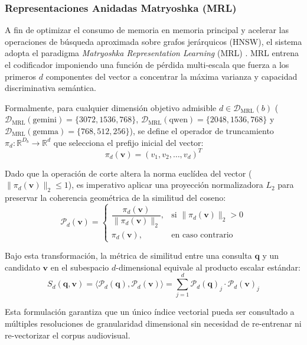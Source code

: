 \subsubsection{Representaciones Anidadas Matryoshka (MRL)}
A fin de optimizar el consumo de memoria en memoria principal y acelerar las operaciones de búsqueda aproximada sobre grafos jerárquicos (HNSW), el sistema adopta el paradigma \textit{Matryoshka Representation Learning} (MRL) \cite{kusupati2022matryoshka}. MRL entrena el codificador imponiendo una función de pérdida multi-escala que fuerza a los primeros $d$ componentes del vector a concentrar la máxima varianza y capacidad discriminativa semántica.

Formalmente, para cualquier dimensión objetivo admisible $d \in \mathcal{D}_{\text{MRL}}(b)$ ($\mathcal{D}_{\text{MRL}}(\text{gemini}) = \{3072, 1536, 768\}$, $\mathcal{D}_{\text{MRL}}(\text{qwen}) = \{2048, 1536, 768\}$ y $\mathcal{D}_{\text{MRL}}(\text{gemma}) = \{768, 512, 256\}$), se define el operador de truncamiento $\pi_d: \mathbb{R}^{D_b} \to \mathbb{R}^d$ que selecciona el prefijo inicial del vector:
\begin{equation}
    \pi_d(\mathbf{v}) = (v_1, v_2, \dots, v_d)^T
\end{equation}

Dado que la operación de corte altera la norma euclídea del vector ($\|\pi_d(\mathbf{v})\|_2 \le 1$), es imperativo aplicar una proyección normalizadora $L_2$ para preservar la coherencia geométrica de la similitud del coseno:
\begin{equation}
    \mathcal{P}_d(\mathbf{v}) = \begin{cases}
        \dfrac{\pi_d(\mathbf{v})}{\|\pi_d(\mathbf{v})\|_2}, & \text{si } \|\pi_d(\mathbf{v})\|_2 > 0 \\
        \pi_d(\mathbf{v}), & \text{en caso contrario}
    \end{cases}
\end{equation}

Bajo esta transformación, la métrica de similitud entre una consulta $\mathbf{q}$ y un candidato $\mathbf{v}$ en el subespacio $d$-dimensional equivale al producto escalar estándar:
\begin{equation}
    S_d(\mathbf{q}, \mathbf{v}) = \langle \mathcal{P}_d(\mathbf{q}), \mathcal{P}_d(\mathbf{v}) \rangle = \sum_{j=1}^d \mathcal{P}_d(\mathbf{q})_j \cdot \mathcal{P}_d(\mathbf{v})_j
\end{equation}

Esta formulación garantiza que un único índice vectorial pueda ser consultado a múltiples resoluciones de granularidad dimensional sin necesidad de re-entrenar ni re-vectorizar el corpus audiovisual.
